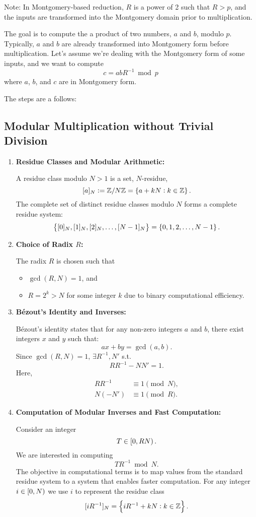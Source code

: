 Note: In Montgomery-based reduction, $R$ is a power of 2 such that $R > p$, and the inputs are transformed into the Montgomery domain prior to multiplication.
\fi

The goal is to compute the a product of two numbers, $a$ and $b$, modulo $p$. Typically, $a$ and $b$ are already transformed into Montgomery form before multiplication. Let's assume we're dealing with the Montgomery form of some inputs, and we want to compute 
\[
c=abR^{-1}\bmod p
\] where $a$, $b$, and $c$ are in Montgomery form.

The steps are a follows:

\subsection{Modular Multiplication without Trivial Division}


\begin{enumerate}[\bf 1.]
	\item \textbf{Residue Classes and Modular Arithmetic:}
	
	A residue class modulo $N>1$ is a set, $N$-residue, \[
	[a]_N:=\mathbb{Z}/N\mathbb{Z}=\set{a + kN: k\in\mathbb{Z}}.
	\]
	The complete set of distinct residue classes modulo $N$ forms a complete residue system: \[
	\set{[0]_N,[1]_N,[2]_N,\dots, [N-1]_N}=\set{0,1,2,\dots, N-1}.
	\]
	\item \textbf{Choice of Radix $R$:}
	
	The radix $R$ is chosen such that 
	\begin{itemize}
		\item $\gcd(R,N)=1$, and
		\item $R=2^k>N$ for some integer $k$ due to binary computational efficiency. 
	\end{itemize}
	\item \textbf{Bézout's Identity and Inverses:}
	
	Bézout's identity states that for any non-zero integers $a$ and $b$, there exist integers $x$ and $y$ such that: \[
	ax+by=\gcd(a,b).
	\] Since $\gcd(R,N)=1$, $\exists R^{-1}, N'$ s.t. \[
	RR^{-1}-NN'=1.
	\] Here, \begin{align*}
		RR^{-1}&\equiv 1\pmod{N},\\
		N(-N')&\equiv 1\pmod{R}.
	\end{align*}
	\item \textbf{Computation of Modular Inverses and Fast Computation:}
	
	Consider an integer \[
	T\in\intco{0,RN}.
	\] We are interested in computing \[
	TR^{-1}\bmod{N}.
	\] The objective in computational terms is to map values from the standard residue system to a system that enables faster computation. For any integer $i\in\intco{0,N}$ we use $i$ to represent the residue class 
	\[
	[iR^{-1}]_N=\set{iR^{-1}+kN:k\in\mathbb{Z}}.
	\]
\end{enumerate}

